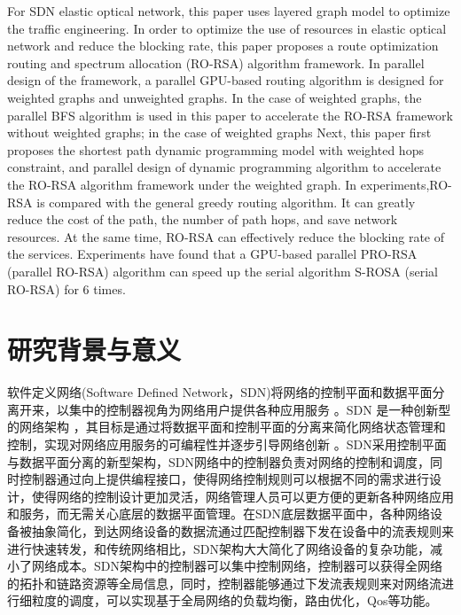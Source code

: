 \documentclass[master]{thesis-uestc}
\begin{document}
\begin{englishabstract}
For SDN elastic optical network, this paper uses layered graph model to optimize the traffic engineering. In order to optimize the use of resources in elastic optical network and reduce the blocking rate, this paper proposes a route optimization routing and spectrum allocation (RO-RSA) algorithm framework. In parallel design of the framework, a parallel GPU-based routing algorithm is designed for weighted graphs and unweighted graphs. In the case of weighted graphs, the parallel BFS algorithm is used in this paper to accelerate the RO-RSA framework without weighted graphs; in the case of weighted graphs Next, this paper first proposes the shortest path dynamic programming model with weighted hops constraint, and parallel design of dynamic programming algorithm to accelerate the RO-RSA algorithm framework under the weighted graph. In experiments,RO-RSA is compared with the general greedy routing algorithm. It can greatly reduce the cost of the path, the number of path hops, and save network resources. At the same time, RO-RSA can effectively reduce the blocking rate of the services. Experiments have found that a GPU-based parallel PRO-RSA (parallel RO-RSA) algorithm can speed up the serial algorithm S-ROSA (serial RO-RSA) for 6 times.


\end{englishabstract}
\thesistableofcontents
\thesisfigurelist
\thesistablelist
\thesischapterexordium
\section{研究背景与意义}
软件定义网络(Software Defined Network，SDN)将网络的控制平面和数据平面分离开来，以集中的控制器视角为网络用户提供各种应用服务 \cite{OpenFlow} \cite{SDN}。SDN 是一种创新型的网络架构 \cite{SDN2}，其目标是通过将数据平面和控制平面的分离来简化网络状态管理和控制，实现对网络应用服务的可编程性并逐步引导网络创新 \cite{SDN3}。SDN采用控制平面与数据平面分离的新型架构，SDN网络中的控制器负责对网络的控制和调度，同时控制器通过向上提供编程接口，使得网络控制规则可以根据不同的需求进行设计，使得网络的控制设计更加灵活，网络管理人员可以更方便的更新各种网络应用和服务，而无需关心底层的数据平面管理。在SDN底层数据平面中，各种网络设备被抽象简化，到达网络设备的数据流通过匹配控制器下发在设备中的流表规则来进行快速转发，和传统网络相比，SDN架构大大简化了网络设备的复杂功能，减小了网络成本。SDN架构中的控制器可以集中控制网络，控制器可以获得全网络的拓扑和链路资源等全局信息，同时，控制器能够通过下发流表规则来对网络流进行细粒度的调度，可以实现基于全局网络的负载均衡，路由优化，Qos等功能。
\end{document}

